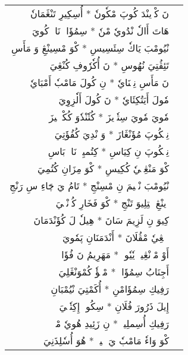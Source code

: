 \documentclass[a4paper, 12pt]{report}
\begin{document}
\begin{longtable}{rl}
\textarabic{نَ كْوٖينْدَ كُوپَ مْكٗونٗ  *  أُسِكِيرِ تَنْڠَمَانٗ} & \\ 
\textarabic{هَاتَ أَالٗ نْدُويٗ مْنٗ  *  سِمُؤَاتٖ نَاوٖ كُويَ} & \\ 
[8mm] 

\textarabic{نْيُومْبَ يَاكٗ سِئَسِيسِ  *  كْوَ مْسِينْڠِ وَ مَأَسِ} & \\ 
\textarabic{تَئِڤُتِيَ نُهُوسِ  *  نَ أُكٗرٗوفِ كُنْڠِيَ} & \\ 
[8mm] 

\textarabic{نَ مَأَسِ نِنٖنَايٗ  *  نِ كُولَ مَامْبٗ أَمْبَايٗ} & \\ 
\textarabic{مٗولَ أَيَتُكِئَايٗ  *  نَ كُولَ أَلٗزِوِيَ} & \\ 
[8mm] 

\textarabic{مٗويَ مٗويَ سِتٗوٖيزَ  *  كُتٗنْدٗوَ كُكْوٖلٖيزَ} & \\ 
\textarabic{نِمٖكُوپَ مُؤَنْڠَازَ  *  وَ نْدِيَ كُفُؤَتِيَ} & \\ 
[8mm] 

\textarabic{نِمٖكُوپَ نِ كِيَاسِ  *  كِتُميِئٖ نَاوٖ بَاسِ} & \\ 
\textarabic{كْوَ مَنْڠِنٖيٗ كُكِيسِ  *  كْوَ مِزَانِ كُتُمِيَ} & \\ 
[8mm] 

\textarabic{نْيُومْبَ نْجٖيمَ نِ مْسِنْجِ  *  تَامُ يَ چَاءِ سِ رَنْجِ} & \\ 
\textarabic{وٖينْڠِ مٖتِلِيوَ تَنْجِ  *  كْوَ فَخَارِ كُزٖنْڠٖيَ} & \\ 
[8mm] 

\textarabic{كِيوَ نِ لَزِيمَ سَانَ  *  هِيلٗ لَ كُؤَنْدَمَانَ} & \\ 
\textarabic{شٖمٖڠِيٗ مْڤُلَانَ  *  أَنْدَمَنَانِ پَمٗويَ} & \\ 
[8mm] 

\textarabic{أَوْ مْوٖنْڠِينٖ يٗيٗوتٖ  *  مَهَرِيمُ نَ فُؤَاتٖ} & \\ 
\textarabic{أَجِنَابُ سِمُؤَاتٖ  *  مْكٖؤٗ كُمْوَنْڠَلِيَ} & \\ 
[8mm] 

\textarabic{رَفِيكِ سِمُؤَامْنِ  *  أُكَمْتِيَ نْيُمْبَانِ} & \\ 
\textarabic{إِيلَ ذَرُورَ فُلَانِ  *  سِكُويٖ إِكِتٗكٖيَ} & \\ 
[8mm] 

\textarabic{رَفِيكِ أُسِملِيچٖ  *  نِ زَئِيدِ هُويٗ مْچٖ} & \\ 
\textarabic{كْوَ وَاءٗ مَامْبٗ يَ چٖيچٖ  *  هُوَ أُسٗلِذَنِيَ} & \\ 
[8mm] 


\end{longtable}
\end{document}
